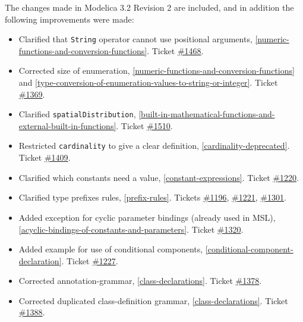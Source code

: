 The changes made in Modelica 3.2 Revision 2 are included, and in
addition the following improvements were made:
\begin{itemize}
\item
  Clarified that \lstinline!String! operator cannot use positional arguments, \cref{numeric-functions-and-conversion-functions}.
  Ticket \href{https://github.com/modelica/ModelicaSpecification/issues/1468}{\#1468}.
\item
  Corrected size of enumeration, \cref{numeric-functions-and-conversion-functions} and \cref{type-conversion-of-enumeration-values-to-string-or-integer}. Ticket
  \href{https://github.com/modelica/ModelicaSpecification/issues/1369}{\#1369}.
\item
  Clarified \lstinline!spatialDistribution!, \cref{built-in-mathematical-functions-and-external-built-in-functions}.
  Ticket \href{https://github.com/modelica/ModelicaSpecification/issues/1510}{\#1510}.
\item
  Restricted \lstinline!cardinality! to give a clear definition, \cref{cardinality-deprecated}.
  Ticket \href{https://github.com/modelica/ModelicaSpecification/issues/1409}{\#1409}.
\item
  Clarified which constants need a value, \cref{constant-expressions}. Ticket
  \href{https://github.com/modelica/ModelicaSpecification/issues/1220}{\#1220}.
\item
  Clarified type prefixes rules, \cref{prefix-rules}. Tickets
  \href{https://github.com/modelica/ModelicaSpecification/issues/1196}{\#1196},
  \href{https://github.com/modelica/ModelicaSpecification/issues/1221}{\#1221},
  \href{https://github.com/modelica/ModelicaSpecification/issues/1301}{\#1301}.
\item
  Added exception for cyclic parameter bindings (already used in MSL),
  \cref{acyclic-bindings-of-constants-and-parameters}. Ticket
  \href{https://github.com/modelica/ModelicaSpecification/issues/1320}{\#1320}.
\item
  Added example for use of conditional components, \cref{conditional-component-declaration}. Ticket
  \href{https://github.com/modelica/ModelicaSpecification/issues/1227}{\#1227}.
\item
  Corrected annotation-grammar, \cref{class-declarations}. Ticket
  \href{https://github.com/modelica/ModelicaSpecification/issues/1378}{\#1378}.
\item
  Corrected duplicated class-definition grammar, \cref{class-declarations}. Ticket
  \href{https://github.com/modelica/ModelicaSpecification/issues/1388}{\#1388}.

\end{itemize}

